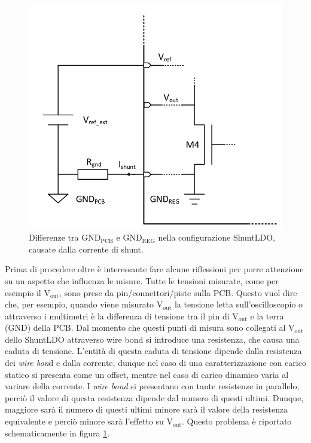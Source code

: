 \begin{figure}
\centering
\includegraphics[scale=.3]{Immagini/Ground}
\caption{Differenze tra $\mathrm{GND_{PCB}}$ e $\mathrm{GND_{REG}}$ nella configurazione ShuntLDO, causate dalla corrente di shunt.}
\label{Ground}
\end{figure}
Prima di procedere oltre è interessante fare alcune riflessioni per porre attenzione su un aspetto che influenza le misure. 
Tutte le tensioni misurate, come per esempio il $\mathrm{V_{out}}$, sono prese da pin/connettori/piste sulla PCB. Questo vuol dire che, per esempio, quando viene misurato $\mathrm{V_{out}}$ la tensione letta sull'oscilloscopio o attraverso i multimetri è la differenza di tensione tra il pin di $\mathrm{V_{out}}$ e la terra (GND) della PCB. 
Dal momento che questi punti di misura sono collegati al $\mathrm{V_{out}}$ dello ShuntLDO attraverso wire bond si introduce una resistenza, che causa una caduta di tensione. 
L'entità di questa caduta di tensione dipende dalla resistenza dei \textit{wire bon}d e dalla corrente, dunque nel caso di una caratterizzazione con carico statico si presenta come un offset, mentre nel caso di carico dinamico varia al variare della corrente. 
I \textit{wire bond} si presentano con tante resistenze in parallelo, perciò il valore di questa resistenza dipende dal numero di questi ultimi. 
Dunque, maggiore sarà il numero di questi ultimi minore sarà il valore della resistenza equivalente e perciò minore sarà l'effetto su $\mathrm{V_{out}}$. Questo problema è riportato schematicamente in figura \ref{Ground}.

